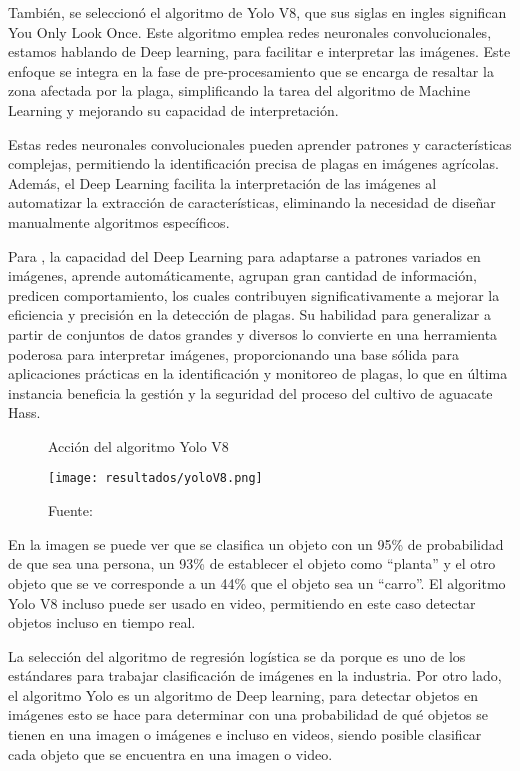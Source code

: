 También, se seleccionó el algoritmo de Yolo V8, que sus siglas en ingles significan You Only Look Once. Este algoritmo emplea redes neuronales convolucionales, estamos hablando de Deep learning, para facilitar e interpretar las imágenes. Este enfoque se integra en la fase de pre-procesamiento que se encarga de resaltar la zona afectada por la plaga, simplificando la tarea del algoritmo de Machine Learning y mejorando su capacidad de interpretación.

Estas redes neuronales convolucionales pueden aprender patrones y características complejas, permitiendo la identificación precisa de plagas en imágenes agrícolas. Además, el Deep Learning facilita la interpretación de las imágenes al automatizar la extracción de características, eliminando la necesidad de diseñar manualmente algoritmos específicos.

Para \cite{schmidhuber2015deep}, la capacidad del Deep Learning para adaptarse a patrones variados en imágenes, aprende automáticamente, agrupan gran cantidad de información, predicen comportamiento, los cuales contribuyen significativamente a mejorar la eficiencia y precisión en la detección de plagas. Su habilidad para generalizar a partir de conjuntos de datos grandes y diversos lo convierte en una herramienta poderosa para interpretar imágenes, proporcionando una base sólida para aplicaciones prácticas en la identificación y monitoreo de plagas, lo que en última instancia beneficia la gestión y la seguridad del proceso del cultivo de aguacate Hass.

\newpage

\begin{figure}[h]
\centering
\caption{Acción del algoritmo Yolo V8}
\texttt{[image: resultados/yoloV8.png]}
\caption*{\footnotesize Fuente: \cite{decoder2023}}
\label{fig:figuraYoloV8}
\end{figure}

En la imagen se puede ver que se clasifica un objeto con un 95\% de probabilidad de que sea una persona, un 93\% de establecer el objeto como “planta” y el otro objeto que se ve corresponde a un 44\% que el objeto sea un “carro”. El algoritmo Yolo V8 incluso puede ser usado en video, permitiendo en este caso detectar objetos incluso en tiempo real.

La selección del algoritmo de regresión logística se da porque es uno de los estándares para trabajar clasificación de imágenes en la industria. Por otro lado, el algoritmo Yolo es un algoritmo de Deep learning, para detectar objetos en imágenes esto se hace para determinar con una probabilidad de qué objetos se tienen en una imagen o imágenes e incluso en videos, siendo posible clasificar cada objeto que se encuentra en una imagen o video.

